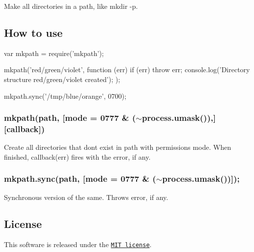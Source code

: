 Make all directories in a path, like {\ttfamily mkdir -\/p}.

\subsection*{How to use}

\begin{DoxyVerb}var mkpath = require('mkpath');

mkpath('red/green/violet', function (err) {
    if (err) throw err;
    console.log('Directory structure red/green/violet created');
});

mkpath.sync('/tmp/blue/orange', 0700);
\end{DoxyVerb}


\subsubsection*{mkpath(path, \mbox{[}mode = 0777 \& ($\sim$process.umask()),\mbox{]} \mbox{[}callback\mbox{]})}

Create all directories that don\textquotesingle{}t exist in {\ttfamily path} with permissions {\ttfamily mode}. When finished, {\ttfamily callback(err)} fires with the error, if any.

\subsubsection*{mkpath.\+sync(path, \mbox{[}mode = 0777 \& ($\sim$process.umask())\mbox{]});}

Synchronous version of the same. Throws error, if any.

\subsection*{License}

This software is released under the \href{http://www.opensource.org/licenses/MIT}{\tt M\+IT license}. 